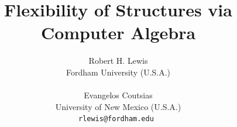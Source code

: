 \documentclass[a4paper]{article} %
\date{} %
\def\titulo#1{\title{#1}} %
\def\autores#1{\author{#1}} %
\begin{document}
\titulo{Flexibility of Structures via Computer Algebra}

\autores{Robert H. Lewis  \\ %
       Fordham University (U.S.A.) \\  \\
       Evangelos Coutsias \\
        University of New Mexico (U.S.A.) \\ %
       \tt{rlewis@fordham.edu} %
       }%


\maketitle

\thispagestyle{empty}



\end{document}
